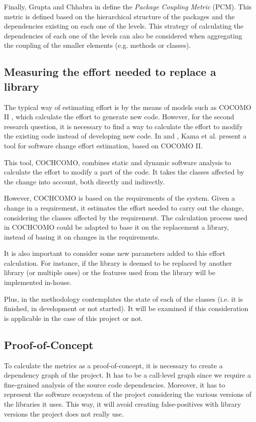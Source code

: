 Finally, Grupta and Chhabra in \cite{gupta2009package} define the \textit{Package Coupling Metric} (PCM). This metric is defined based on the hierarchical structure of the packages and the dependencies existing on each one of the levels. This strategy of calculating the dependencies of each one of the levels can also be considered when aggregating the coupling of the smaller elements (e.g. methods or classes).

\subsection{Measuring the effort needed to replace a library}
The typical way of estimating effort is by the means of models such as COCOMO II \cite{sharma2011analysis}, which calculate the effort to generate new code. However, for the second research question, it is necessary to find a way to calculate the effort to modify the existing code instead of developing new code. In \cite{kama2014cochcomo} and \cite{asl2013change}, Kama et al. present a tool for software change effort estimation, based on COCOMO II.

This tool, COCHCOMO, combines static and dynamic software analysis to calculate the effort to modify a part of the code. It takes the classes affected by the change into account, both directly and indirectly.

However, COCHCOMO is based on the requirements of the system. Given a change in a requirement, it estimates the effort needed to carry out the change, considering the classes affected by the requirement. The calculation process used in COCHCOMO could be adapted to base it on the replacement a library, instead of basing it on changes in the requirements.

It is also important to consider some new parameters added to this effort calculation. For instance, if the library is deemed to be replaced by another library (or multiple ones) or the features used from the library will be implemented in-house.

Plus, in \cite{kama2014cochcomo} the methodology contemplates the state of each of the classes (i.e. it is finished, in development or not started). It will be examined if this consideration is applicable in the case of this project or not.

\subsection{Proof-of-Concept}
To calculate the metrics as a proof-of-concept, it is necessary to create a dependency graph of the project. It has to be a call-level graph since we require a fine-grained analysis of the source code dependencies. Moreover, it has to represent the software ecosystem of the project considering the various versions of the libraries it uses. This way, it will avoid creating false-positives with library versions the project does not really use.

